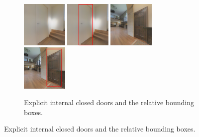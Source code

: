 \begin{figure}[h!]
	\begin{subfigure}[b]{\linewidth}
		\centering
		\includegraphics[width=0.24\textwidth]{images/explicitinternalclosed1.png}
		\hfill
		\includegraphics[width=0.24\textwidth]{images/explicitinternalclosed1boxed.png}
		\includegraphics[width=0.24\textwidth]{images/explicitinternalclosed2.png}
		\hfill
		\includegraphics[width=0.24\textwidth]{images/explicitinternalclosed2boxed.png}
		\caption{Explicit internal closed doors and the relative bounding boxes.}	
	\end{subfigure}
	

\end{figure}
